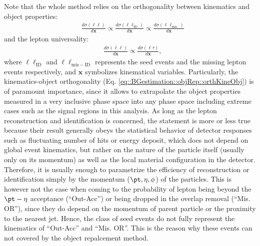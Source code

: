 Note that the whole method relies on the orthogonality between kinematics and object properties:
\begin{align}
  & \frac{d\sigma(\ell\ell)}{d\bm{x}}
  \propto \frac{d\sigma(\ell\ell_{\mathrm{ID}})}{d\bm{x}} 
  \propto \frac{d\sigma(\ell\ell_{\mathrm{mis.}})}{d\bm{x}} 
  \label{eq::BGestimation::objRep::orthKineObj}
\end{align}
and the lepton universality:
\begin{align}
  & \frac{d\sigma(\ell\ell)}{d\bm{x}}
  \propto \frac{d\sigma(\ell\tau)}{d\bm{x}},
  \label{eq::BGestimation::objRep::lepUniv}
\end{align}
where $\ell\ell_{\mathrm{ID}}$ and $\ell\ell_{\mathrm{mis-ID}}$ represents the seed events and the missing lepton events respectively, and $\bm{x}$ symbolizes kinematical variables. 
Particularly, the kinematics-object orthogonality (Eq. \ref{eq::BGestimation::objRep::orthKineObj}) is of paramount importance, since it allows to extrapolate the object properties measured in a very inclusive phase space into any phase space including extreme cases such as the signal regions in this analysis. As long as the lepton reconstruction and identification is concerned, the statement is more or less true
because their result generally obeys the statistical behavior of detector responses such as fluctuating number of hits or energy deposit, which does not depend on global event kinematics, but rather on the nature of the particle itself (usually only on its momentum) as well as the local material configuration in the detector. Therefore, it is usually enough to parametrize the efficiency of reconstruction or identification simply by the momentum ($\pt, \eta, \phi$) of the particles. This is however not the case when coming to the probability of lepton being beyond the $\pt-\eta$ acceptance (``Out-Acc'') or being dropped in the overlap removal (``Mis. OR''), since they do depend on the momentum of parent particle or the proximity to the nearest jet. Hence, the class of seed events do not fully represent the kinematics of ``Out-Acc'' and ``Mis. OR''. This is the reason why these events can not covered by the object repalcement method. \\

